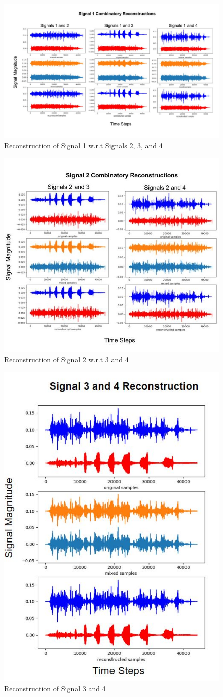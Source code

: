 \documentclass[12pt]{article}
\begin{document}
\begin{figure}[!htb] %
  \centering
  \includegraphics[width =0.7\linewidth]{signals_1.jpg}
  \caption{Reconstruction of Signal 1 w.r.t Signals 2, 3, and 4}
\end{figure}
\FloatBarrier
\begin{figure}[!htb] %
  \centering
  \includegraphics[width = 0.5\linewidth]{signals_2.jpg}
  \caption{Reconstruction of Signal 2 w.r.t 3 and 4}
\end{figure}
\FloatBarrier
\begin{figure}[!htb] %
  \centering
  \includegraphics[width = 0.5\linewidth]{signals_3.JPG}
  \caption{Reconstruction of Signal 3 and 4}
\end{figure}
\end{document}
